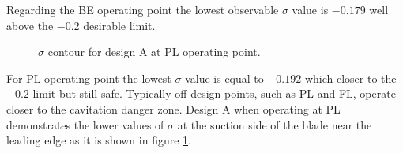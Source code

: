Regarding the BE operating point the lowest observable $\sigma$ value is $-0.179$ well above the $-0.2$ desirable limit. 

\begin{figure}[h!]
\begin{minipage}[b]{1\linewidth}
 \centering
\end{minipage}
\caption{$\sigma$ contour for design A at PL operating point.}
\label{Francis-A-PL}
\end{figure}

For PL operating point the lowest $\sigma$ value is equal to $-0.192$ which closer to the $-0.2$ limit but still safe. Typically off-design points, such as PL and FL, operate closer to the cavitation danger zone. Design A when operating at PL demonstrates the lower values of $\sigma$ at the suction side of the blade near the leading edge as it is shown in figure \ref{Francis-A-PL}.  
 

